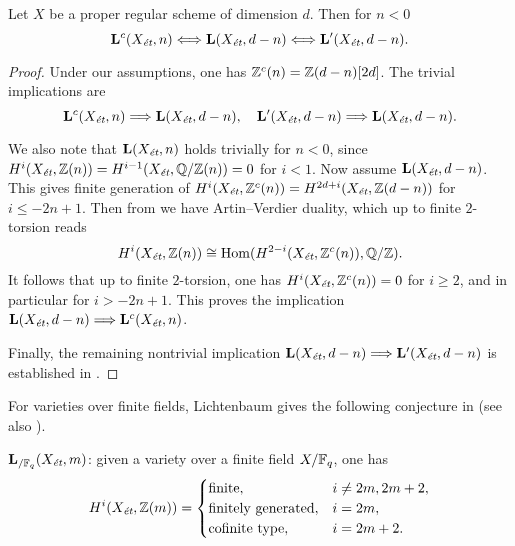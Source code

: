 \documentclass{article}
\numberwithin{equation}{section}
\begin{document}
\begin{proposition}
  \label{prop:Lc-Xet-n-vs-L-Xet-d-n}
  Let $X$ be a proper regular scheme of dimension $d$. Then for $n < 0$
  \[ \mathbf{L}^c (X_\et, n) \Longleftrightarrow
    \mathbf{L} (X_\et, d-n) \Longleftrightarrow
    \mathbf{L}' (X_\et, d-n). \]

  \begin{proof}
    Under our assumptions, one has $\ZZ^c (n) = \ZZ (d-n) [2d]$. The trivial
    implications are
    \[ \mathbf{L}^c (X_\et, n) \Longrightarrow \mathbf{L} (X_\et, d-n), \quad
      \mathbf{L}' (X_\et, d-n) \Longrightarrow \mathbf{L} (X_\et, d-n). \]

    We also note that $\mathbf{L} (X_\et, n)$ holds trivially for $n < 0$, since
    $H^i (X_\et, \ZZ (n)) = H^{i-1} (X_\et, \QQ/\ZZ (n)) = 0$ for $i < 1$.
    Now assume $\mathbf{L} (X_\et, d-n)$. This gives finite generation of
    $H^i (X_\et, \ZZ^c (n)) = H^{2d+i} (X_\et, \ZZ (d-n))$ for $i \le -2n + 1$.
    Then from \cite[Proposition~3.4]{Flach-Morin-2018} we have Artin--Verdier
    duality, which up to finite $2$-torsion reads
    $$H^i (X_\et, \ZZ (n)) \cong \Hom (H^{2-i} (X_\et, \ZZ^c (n)), \QQ/\ZZ).$$
    It follows that up to finite $2$-torsion, one has
    $H^i (X_\et, \ZZ^c (n)) = 0$ for $i \ge 2$, and in particular for
    $i > -2n + 1$. This proves the implication
    $\mathbf{L} (X_\et, d-n) \Longrightarrow \mathbf{L}^c (X_\et, n)$.

    Finally, the remaining nontrivial implication
    $\mathbf{L} (X_\et, d-n) \Longrightarrow \mathbf{L}' (X_\et, d-n)$ is
    established in \cite[Proposition~3.4]{Flach-Morin-2018}.
  \end{proof}
\end{proposition}

For varieties over finite fields, Lichtenbaum gives the following conjecture in
\cite[\S 7]{Lichtenbaum-1984} (see also \cite[\S 4]{Geisser-2017}).

\begin{conjecture}
  $\mathbf{L}_{/\FF_q} (X_\et, m)$: given a variety over a finite field
  $X/\FF_q$, one has
  \[ H^i (X_\et, \ZZ (m)) = \begin{cases}
      \text{finite}, & i \ne 2m, 2m+2, \\
      \text{finitely generated}, & i = 2m, \\
      \text{cofinite type}, & i = 2m + 2.
    \end{cases} \]
\end{conjecture}
\end{document}
